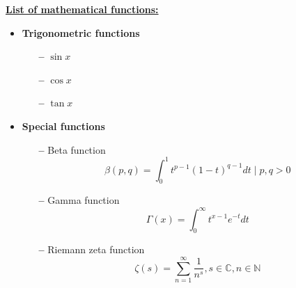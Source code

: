 \documentclass{article}
\begin{document}
\noindent
\underline{\textbf{\fontsize{14}{16}\selectfont List of mathematical functions:}}

\begin{itemize}
  \item \textbf{Trigonometric functions}
    \begin{enumerate}
      \item[\textbf{--}] $\sin x$
      \item[\textbf{--}] $\cos x$
      \item[\textbf{--}] $\tan x$
    \end{enumerate}
  \item \textbf{Special functions}
    \begin{enumerate}
      \item[\textbf{--}] Beta function $$ \beta(p,q)=\int_{0}^{1} t^{p-1}(1-t)^{q-1}dt \mid p,q>0  $$
      \item[\textbf{--}] Gamma function $$ \Gamma(x)=\int_{0}^{\infty} t^{x-1}e^{-t} dt $$
      \item[\textbf{--}] Riemann zeta function $$\zeta(s) = \sum_{n=1}^{\infty} \frac{1}{n^s},s\in \mathbb{C},n\in\mathbb{N}     $$
    \end{enumerate}
\end{itemize}
\end{document}
